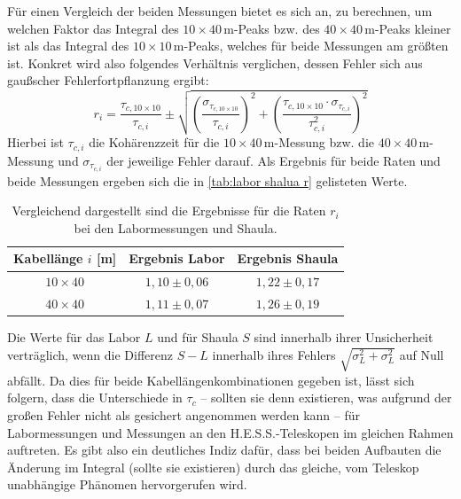 Für einen Vergleich der beiden Messungen bietet es sich an, zu berechnen, um welchen Faktor das Integral des $10\times 40\,\mathrm{m}$-Peaks bzw. des $40\times 40\,\mathrm{m}$-Peaks kleiner ist als das Integral des $10\times 10\,\mathrm{m}$-Peaks, welches für beide Messungen am größten ist. 
Konkret wird also folgendes Verhältnis verglichen, dessen Fehler sich aus gaußscher Fehlerfortpflanzung ergibt:
\begin{equation}
    r_i = \frac{\tau_{c,10\times10}}{\tau_{c,i}} \pm \sqrt{\left(\frac{\sigma_{\tau_{c,10\times10}}}{\tau_{c,i}}\right)^2 + \left(\frac{\tau_{c,10\times10} \cdot \sigma_{\tau_{c,i}}}{\tau_{c,i}^2}\right)^2}
\end{equation}
Hierbei ist $\tau_{c,i}$ die Kohärenzzeit für die $10\times 40\,\mathrm{m}$-Messung bzw. die $40\times 40\,\mathrm{m}$-Messung und $\sigma_{\tau_{c,i}}$ der jeweilige Fehler darauf. 
Als Ergebnis für beide Raten und beide Messungen ergeben sich die in \autoref{tab:labor shalua r} gelisteten Werte. 
\begin{table}[h]
    \centering
    \begin{tabular}{|c|c|c|}\hline
        Kabellänge $i$ [m]       & Ergebnis Labor      & Ergebnis Shaula     \\\hline
        $10\times 40$            & $1{,}10 \pm 0{,}06$ & $1{,}22 \pm 0{,}17$ \\\hline
        $40\times 40$            & $1{,}11 \pm 0{,}07$ & $1{,}26 \pm 0{,}19$ \\\hline
    \end{tabular}
    \caption{Vergleichend dargestellt sind die Ergebnisse für die Raten $r_i$ bei den Labormessungen und Shaula.}
    \label{tab:labor shalua r}
\end{table}
Die Werte für das Labor $L$ und für Shaula $S$ sind innerhalb ihrer Unsicherheit verträglich, wenn die Differenz $S-L$ innerhalb ihres Fehlers $\sqrt{\sigma_L^2 + \sigma_L^2}$ auf Null abfällt. 
Da dies für beide Kabellängenkombinationen gegeben ist, lässt sich folgern, dass die Unterschiede in $\tau_c$ -- sollten sie denn existieren, was aufgrund der großen Fehler nicht als gesichert angenommen werden kann -- für Labormessungen und Messungen an den H.E.S.S.-Teleskopen im  gleichen Rahmen auftreten. 
Es gibt also ein deutliches Indiz dafür, dass bei beiden Aufbauten die Änderung im Integral (sollte sie existieren) durch das gleiche, vom Teleskop unabhängige Phänomen hervorgerufen wird. \\

